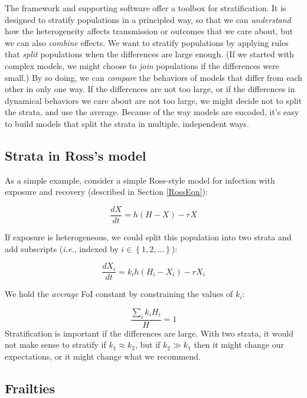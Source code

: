 \documentclass[
]{book}
\begin{document}
The framework and supporting software offer a toolbox for stratification. It is designed to stratify populations in a principled way, so that we can \emph{understand} how the heterogeneity affects transmission or outcomes that we care about, but we can also \emph{combine} effects. We want to stratify populations by applying rules that \emph{split} populations when the differences are large enough. (If we started with complex models, we might choose to \emph{join} populations if the differences were small.) By so doing, we can \emph{compare} the behaviors of models that differ from each other in only one way. If the differences are not too large, or if the differences in dynamical behaviors we care about are not too large, we might decide not to split the strata, and use the average. Because of the way models are encoded, it's easy to build models that split the strata in multiple, independent ways.

\hypertarget{strata-in-rosss-model}{%
\subsection{Strata in Ross's model}\label{strata-in-rosss-model}}

As a simple example, consider a simple Ross-style model for infection with exposure and recovery (described in Section \ref{RossEqn}):

\[\frac{dX}{dt} = h (H-X)-r X\]

If exposure is heterogeneous, we could split this population into two strata and add subscripts (\emph{i.e.}, indexed by \(i \in \left\{1,2, \ldots \right\}\)):

\[\frac{dX_i}{dt} =  k_i h (H_i -X_i)-r X_i\]

We hold the \emph{average} FoI constant by constraining the values of \(k_i\):

\[\frac{\sum_i k_i H_i}{H} = 1\]
Stratification is important if the differences are large. With two strata, it would not make sense to stratify if \(k_1 \approx k_2\), but if \(k_2 \gg k_1\) then it might change our expectations, or it might change what we recommend.

\hypertarget{frailties}{%
\subsection{Frailties}\label{frailties}}
\end{document}
